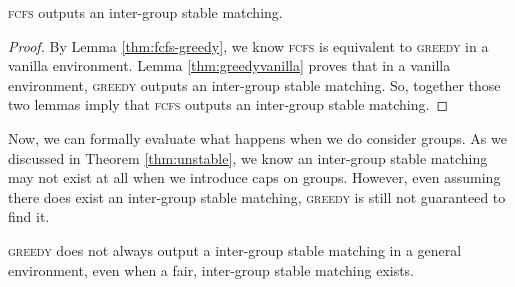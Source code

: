 \begin{theorem}
  \label{thm:fcfs-stable}
  \textsc{fcfs} outputs an inter-group stable matching.
\end{theorem}

\begin{proof}
  By Lemma \ref{thm:fcfs-greedy}, we know \textsc{fcfs} is equivalent to
  \textsc{greedy} in a vanilla environment. Lemma \ref{thm:greedyvanilla} proves
  that in a vanilla environment, \textsc{greedy} outputs an inter-group stable
  matching. So, together those two lemmas imply that \textsc{fcfs} outputs an
  inter-group stable matching.
\end{proof}

Now, we can formally evaluate what happens when we do consider groups. As we
discussed in Theorem \ref{thm:unstable}, we know an inter-group stable matching
may not exist at all when we introduce caps on groups. However, even assuming there does
exist an inter-group stable matching, \textsc{greedy} is still not guaranteed to find it.

\newpage 

\begin{theorem}
  \label{thm:greedyunstable}
  \textsc{greedy} does not always output a inter-group stable matching in a
  general environment, even when a fair, inter-group stable matching exists.
\end{theorem}

